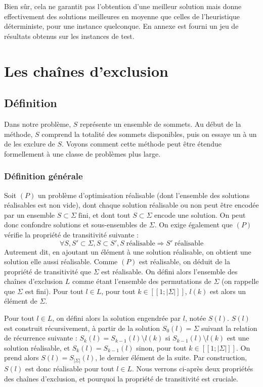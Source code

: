 \documentclass[12pt,a4paper]{article}
\begin{document}
Bien sûr, cela ne garantit pas l'obtention d'une meilleur solution mais donne effectivement des solutions meilleures en moyenne que celles de l'heuristique déterministe, pour une instance quelconque. En annexe est fourni un jeu de résultats obtenus sur les instances de test.

\newpage

\section{Les chaînes d'exclusion}
\subsection{Définition}
Dans notre problème, $S$ représente un ensemble de sommets. Au début de la méthode, $S$ comprend la totalité des sommets disponibles, puis on essaye un à un de les exclure de $S$. Voyons comment cette méthode peut être étendue formellement à une classe de problèmes plus large.

\subsubsection{Définition générale}
Soit $(P)$ un problème d'optimisation réalisable (dont l'ensemble des solutions réalisables est non vide), dont chaque solution réalisable ou non peut être encodée par un ensemble $S\subset \Sigma \;\text{fini}$, et dont tout $S\subset \Sigma$ encode une solution. On peut donc confondre solutions et sous-ensembles de $\Sigma$. On exige également que $(P)$  vérifie la propriété de transitivité suivante :
\[\forall S,S'\subset \Sigma,S\subset S',S \;\text{réalisable} \Rightarrow  S'\;\text{réalisable}\]
Autrement dit, en ajoutant un élément à une solution réalisable, on obtient une solution elle aussi réalisable. Comme $(P)$ est réalisable, on déduit de la propriété de transitivité que $\Sigma$ est réalisable. On défini alors l'ensemble des chaînes d'exclusion $L$ comme étant l'ensemble des permutations de $\Sigma$ (on rappelle que $\Sigma$ est fini). Pour tout $l\in L$, pour tout $k\in[\![1;|\Sigma |]\!]$, $l(k)$ est alors un élément de $\Sigma$.

Pour tout $l\in L$, on défini alors la solution engendrée par $l$, notée $S(l)$. $S(l)$ est construit récursivement, à partir de la solution $S_0(l)=\Sigma$ suivant la relation de récurrence suivante : $S_{k}(l)=S_{k-1}(l)\setminus l(k)$ si $S_{k-1}(l)\setminus l(k)$ est une solution réalisable, et $S_{k}(l)=S_{k-1}(l)$ sinon, pour tout $k\in[\![1;|\Sigma |]\!]$. On prend alors $S(l)=S_{|\Sigma |}(l)$, le dernier élément de la suite. Par construction, $S(l)$ est donc réalisable pour tout $l\in L$. Nous verrons ci-après deux propriétés des chaînes d'exclusion, et pourquoi la propriété de transitivité est cruciale.  
\end{document}
